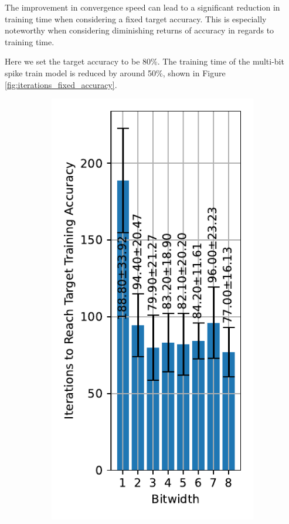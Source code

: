     The improvement in convergence speed can lead to a significant reduction in training time when considering a fixed target accuracy. This is especially noteworthy when considering diminishing returns of accuracy in regards to training time. 

    Here we set the target accuracy to be 80\%. The training time of the multi-bit spike train model is reduced by around 50\%, shown in Figure \ref{fig:iterations_fixed_accuracy}. 
    \begin{figure}[!htpb]
        \centering
        \begin{subfigure}[H]{0.45\textwidth}
            \centering
            \includegraphics[width=\textwidth]{../standard/FashionMNIST/plots/fashionmnist_train_iters.pdf}

\end{subfigure}
\end{figure}
